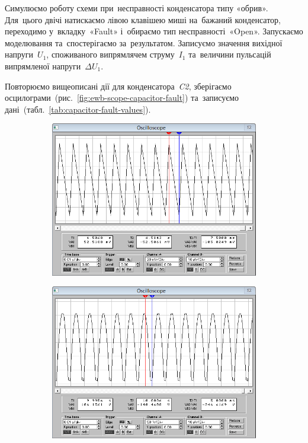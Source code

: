 \documentclass[
	a4paper,
	oneside,
	BCOR = 10mm,
	DIV = 12,
	12pt,
	headings = normal,
]{scrartcl}
\newcommand{\schel}[1]{\textit{#1}}
\begin{document}
			Симулюємо роботу схеми при~несправності конденсатора типу «обрив». Для~цього двічі натискаємо лівою клавішею миші на~бажаний конденсатор, переходимо у~вкладку~«\textenglish{Fault}» і~обираємо тип несправності~«\textenglish{Open}». Запускаємо моделювання та~спостерігаємо за~результатом. Записуємо значення вихідної напруги~$U_1$, споживаного випрямлячем струму~$I_1$ та~величини пульсацій випрямленої напруги~$\Delta U_1$.  

			Повторюємо вищеописані дії для конденсатора~\schel{C2}, зберігаємо осцилограми~(рис.~\ref{fig:ewb-scope-capacitor-fault}) та~записуємо дані~(табл.~\ref{tab:capacitor-fault-values}). 

			\begin{figure}[!htbp]
				\centering
				\begin{subfigure}[t]{0.5\columnwidth}
					\centering
					\includegraphics[height = 8\baselineskip]{./assets/y03s02-pcdiag-lab-01-p03-01b.png}
					\caption{}
					\label{subfig:ewb-scope-03-01}
				\end{subfigure}%
				\begin{subfigure}[t]{0.5\columnwidth}
					\centering
					\includegraphics[height = 8\baselineskip]{./assets/y03s02-pcdiag-lab-01-p03-02b.png}

\end{subfigure}
\end{figure}
\end{document}
